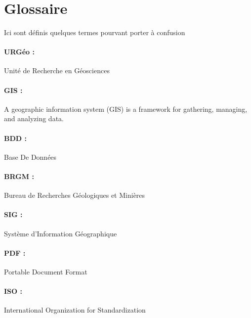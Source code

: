 \section{Glossaire}
\paragraph{}Ici sont définis quelques termes pourvant porter à confusion
\paragraph{URGéo :}
Unité de Recherche en Géosciences

\paragraph{GIS :}  
A geographic information system (GIS) is a framework for gathering, managing, and analyzing data.

\paragraph{BDD :} 
Base De Données

\paragraph{BRGM :}
Bureau de Recherches Géologiques et Minières

\paragraph{SIG :}
Système d’Information Géographique

\paragraph{PDF :}
Portable Document Format

\paragraph{ISO :}
International Organization for Standardization